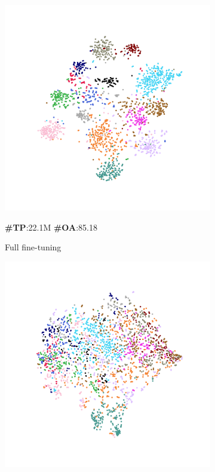 \begin{figure}
    \centering
    \begin{subfigure}{0.24\textwidth}
        \centering
        \includegraphics[width=\linewidth]{fig/tsne/point_mae.pdf}
        \caption*{\textbf{\#TP}:22.1M \textbf{\#OA}:85.18}
        \caption{Full fine-tuning}
        \label{fig:sub1}
    \end{subfigure}
    \hfill
    \begin{subfigure}{0.24\textwidth}
        \centering
        \includegraphics[width=\linewidth]{fig/tsne/LP.pdf}

\end{subfigure}
\end{figure}
